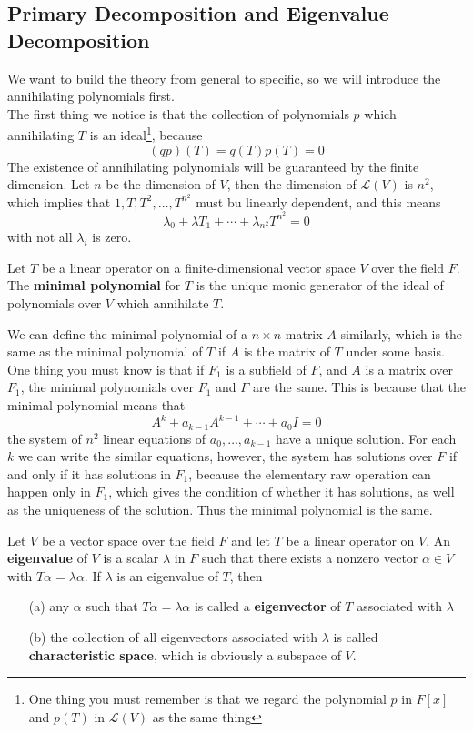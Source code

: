 \documentclass{article}
\begin{document}
\subsection{Primary Decomposition and Eigenvalue Decomposition}
We want to build the theory from general to specific, so we will introduce the annihilating polynomials first.\\
\indent The first thing we notice is that the collection of polynomials $p$ which annihilating $T$ is an ideal\footnote{One thing you must remember is that we regard the polynomial $p$ in $F[x]$ and $p(T)$ in $\mathcal{L}(V)$ as the same thing}, because
\[(qp)(T)=q(T)p(T)=0\]
\indent The existence of annihilating polynomials will be guaranteed by the finite dimension. Let $n$ be the dimension of $V$, then the dimension of $\mathcal{L}(V)$ is $n^2$, which implies that $1,T,T^2,\dots,T^{n^2}$ must bu linearly dependent, and this means 
\[\lambda_0+\lambda T_1+\cdots+\lambda_{n^2}T^{n^2}=0\]
with not all $\lambda_i$ is zero.
\begin{dde}
	Let $T$ be a linear operator on a finite-dimensional vector space $V$ over the field $F$. The \textbf{minimal polynomial} for $T$ is the unique monic generator of the ideal of polynomials over $V$ which annihilate $T$.
\end{dde}
We can define the minimal polynomial of a $n\times n$ matrix $A$ similarly, which is the same as the minimal polynomial of $T$ if $A$ is the matrix of $T$ under some basis.\\
\indent One thing you must know is that if $F_1$ is a subfield of $F$, and $A$ is a matrix over $F_1$, the minimal polynomials over $F_1$ and $F$ are the same. This is because that the minimal polynomial means that
\[A^k+a_{k-1}A^{k-1}+\cdots+a_0I=0\]
the system of $n^2$ linear equations of $a_0,\dots,a_{k-1}$ have a unique solution. For each $k$ we can write the similar equations, however, the system has solutions over $F$ if and only if it has solutions in $F_1$, because the elementary raw operation can happen only in $F_1$, which gives the condition of whether it has solutions, as well as the uniqueness of the solution. Thus the minimal polynomial is the same.\\   
\begin{dde}
	Let $V$ be a vector space over the field $F$ and let $T$ be a linear operator on $V$. An \textbf{eigenvalue} of $V$ is a scalar $\lambda$ in $F$ such that there exists a nonzero vector $\alpha\in V$ with $T\alpha=\lambda\alpha$. If $\lambda$ is an eigenvalue of $T$, then
	\begin{enumerate}
		\item [(a)]any $\alpha$ such that $T\alpha=\lambda\alpha$ is called a \textbf{eigenvector} of $T$ associated with $\lambda$
		\item [(b)]the collection of all eigenvectors associated with $\lambda$ is called \textbf{characteristic space}, which is obviously a subspace of $V$.
	\end{enumerate}
\end{dde}
\end{document}
